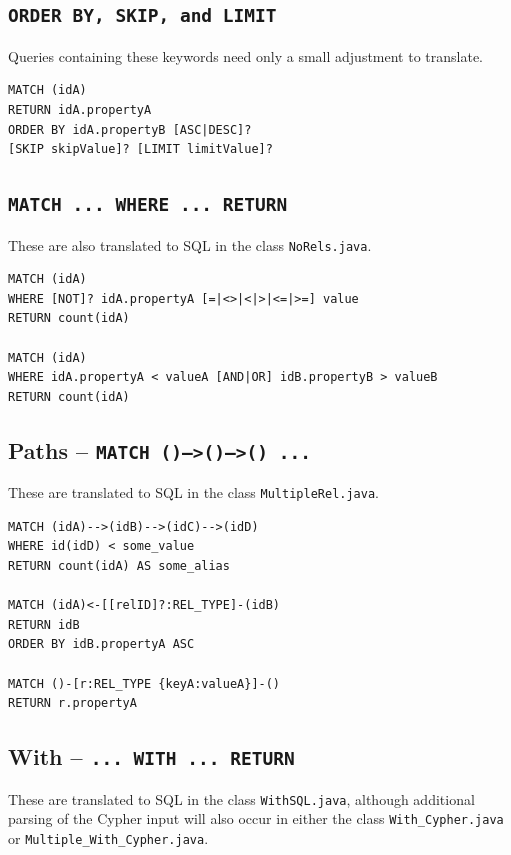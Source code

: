 \documentclass[letterpaper]{ltxdoc}
\begin{document}
\subsection*{\texttt{ORDER BY, SKIP, and LIMIT}}
Queries containing these keywords need only a small adjustment to translate.

\medskip

\begin{lstlisting}[language = Cypher]
MATCH (idA)
RETURN idA.propertyA
ORDER BY idA.propertyB [ASC|DESC]?
[SKIP skipValue]? [LIMIT limitValue]?
\end{lstlisting}

\newpage

\subsection*{\texttt{MATCH ... WHERE ... RETURN}}
These are also translated to SQL in the class \texttt{NoRels.java}.

\medskip

\begin{lstlisting}[language = Cypher]
MATCH (idA)
WHERE [NOT]? idA.propertyA [=|<>|<|>|<=|>=] value
RETURN count(idA)

MATCH (idA)
WHERE idA.propertyA < valueA [AND|OR] idB.propertyB > valueB
RETURN count(idA)
\end{lstlisting}

\subsection*{Paths -- \texttt{MATCH ()-->()-->() ...}}
These are translated to SQL in the class \texttt{MultipleRel.java}.

\medskip

\begin{lstlisting}[language = Cypher]
MATCH (idA)-->(idB)-->(idC)-->(idD)
WHERE id(idD) < some_value
RETURN count(idA) AS some_alias

MATCH (idA)<-[[relID]?:REL_TYPE]-(idB)
RETURN idB
ORDER BY idB.propertyA ASC

MATCH ()-[r:REL_TYPE {keyA:valueA}]-()
RETURN r.propertyA
\end{lstlisting}

\subsection*{With -- \texttt{... WITH ... RETURN}}
These are translated to SQL in the class \texttt{WithSQL.java}, although additional parsing of the Cypher input will also occur in either the class \texttt{With\_Cypher.java} or \texttt{Multiple\_With\_Cypher.java}.
\end{document}
